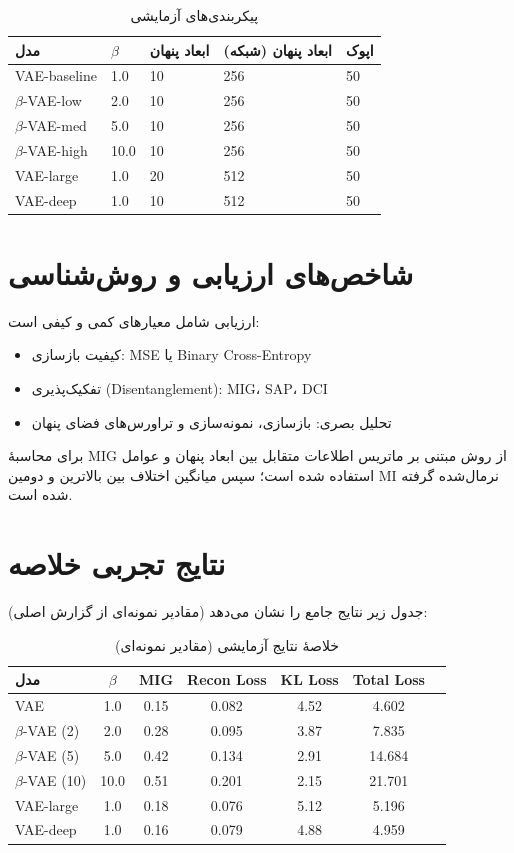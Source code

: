 \begin{table}[H]
\centering
\begin{tabular}{@{}lllll@{}}
\toprule
\textbf{مدل} & \textbf{$\beta$} & \textbf{ابعاد پنهان} & \textbf{ابعاد پنهان (شبکه)} & \textbf{اپوک} \\
\midrule
VAE-baseline & 1.0 & 10 & 256 & 50 \\
$\beta$-VAE-low & 2.0 & 10 & 256 & 50 \\
$\beta$-VAE-med & 5.0 & 10 & 256 & 50 \\
$\beta$-VAE-high & 10.0 & 10 & 256 & 50 \\
VAE-large & 1.0 & 20 & 512 & 50 \\
VAE-deep & 1.0 & 10 & 512 & 50 \\
\bottomrule
\end{tabular}
\caption{پیکربندی‌های آزمایشی}
\label{tab:exp_configs}
\end{table}

\section{شاخص‌های ارزیابی و روش‌شناسی}
ارزیابی شامل معیارهای کمی و کیفی است:
\begin{itemize}
  \item کیفیت بازسازی: MSE یا Binary Cross-Entropy
  \item تفکیک‌پذیری (Disentanglement): MIG، SAP، DCI
  \item تحلیل بصری: بازسازی، نمونه‌سازی و تراورس‌های فضای پنهان
\end{itemize}

برای محاسبهٔ MIG از روش مبتنی بر ماتریس اطلاعات متقابل بین ابعاد پنهان و عوامل استفاده شده است؛ سپس میانگین اختلاف بین بالاترین و دومین MI نرمال‌شده گرفته شده است.

\section{نتایج تجربی خلاصه}
جدول زیر نتایج جامع را نشان می‌دهد (مقادیر نمونه‌ای از گزارش اصلی):

\begin{table}[H]
\centering
\begin{tabular}{@{}lcccccc@{}}
\toprule
\textbf{مدل} & \textbf{$\beta$} & \textbf{MIG} & \textbf{Recon Loss} & \textbf{KL Loss} & \textbf{Total Loss} \\
\midrule
VAE & 1.0 & 0.15 & 0.082 & 4.52 & 4.602 \\
$\beta$-VAE (2) & 2.0 & 0.28 & 0.095 & 3.87 & 7.835 \\
$\beta$-VAE (5) & 5.0 & 0.42 & 0.134 & 2.91 & 14.684 \\
$\beta$-VAE (10) & 10.0 & 0.51 & 0.201 & 2.15 & 21.701 \\
VAE-large & 1.0 & 0.18 & 0.076 & 5.12 & 5.196 \\
VAE-deep & 1.0 & 0.16 & 0.079 & 4.88 & 4.959 \\
\bottomrule
\end{tabular}
\caption{خلاصهٔ نتایج آزمایشی (مقادیر نمونه‌ای)}
\label{tab:exp_summary}
\end{table}


